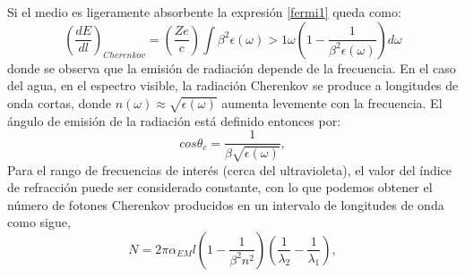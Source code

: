 Si el medio es ligeramente absorbente la expresión \ref{fermi1} queda como:
\begin{equation}
\left(\frac{dE}{dl}\right)_{Cherenkov}=\left(\frac{Ze}{c}\right)\int{\beta^{2}\epsilon(\omega)>1} \omega\left(1-\frac{1}{\beta^{2}\epsilon(\omega)}\right)d\omega
\end{equation}
donde se observa que la emisión de radiación depende de la frecuencia. En el caso del agua, en el espectro visible, la radiación Cherenkov se produce a longitudes de onda cortas, donde  $n(\omega) \approx \sqrt{\epsilon(\omega)}$ aumenta levemente con la frecuencia. El ángulo de emisión de la radiación está definido entonces por:
\begin{equation}
cos\theta_{c}=\frac{1}{\beta\sqrt{\epsilon(\omega)}},
\end{equation}
Para el rango de frecuencias de interés (cerca del ultravioleta), el valor del índice de refracción puede ser considerado constante, con lo que podemos obtener el número de fotones Cherenkov producidos en un intervalo de longitudes de onda como sigue,
\begin{equation}
N=2\pi \alpha_{EM}l\left(1-\frac{1}{\beta^{2}n^{2}}\right)\left(\frac{1}{\lambda_{2}}-\frac{1}{\lambda_{1}}\right),
\label{cherenkovnumber}
\end{equation}




